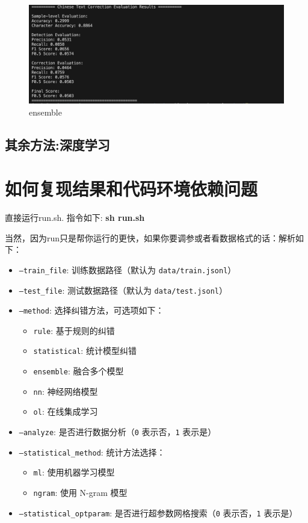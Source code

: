\documentclass[answers]{exam}  %
\begin{document}
\begin{figure}[H]
    \centering
    \label{ensemble}
    \includegraphics[width=.6\textwidth]{../pic/ensemble.png} 
    \caption{ensemble}  
\end{figure}



\subsection{其余方法:深度学习}

\section{如何复现结果和代码环境依赖问题}

直接运行run.sh. 指令如下:
\textbf{sh run.sh}

当然，因为run只是帮你运行的更快，如果你要调参或者看数据格式的话：解析如下：

\begin{itemize}
    \item \texttt{--train\_file}: 训练数据路径（默认为 \texttt{data/train.jsonl}）
    \item \texttt{--test\_file}: 测试数据路径（默认为 \texttt{data/test.jsonl}）
    \item \texttt{--method}: 选择纠错方法，可选项如下：
    \begin{itemize}
        \item \texttt{rule}: 基于规则的纠错
        \item \texttt{statistical}: 统计模型纠错
        \item \texttt{ensemble}: 融合多个模型
        \item \texttt{nn}: 神经网络模型
        \item \texttt{ol}: 在线集成学习
    \end{itemize}
    \item \texttt{--analyze}: 是否进行数据分析（\texttt{0} 表示否，\texttt{1} 表示是）
    \item \texttt{--statistical\_method}: 统计方法选择：
    \begin{itemize}
        \item \texttt{ml}: 使用机器学习模型
        \item \texttt{ngram}: 使用 N-gram 模型
    \end{itemize}
    \item \texttt{--statistical\_optparam}: 是否进行超参数网格搜索（\texttt{0} 表示否，\texttt{1} 表示是）
\end{itemize}
\end{document}
